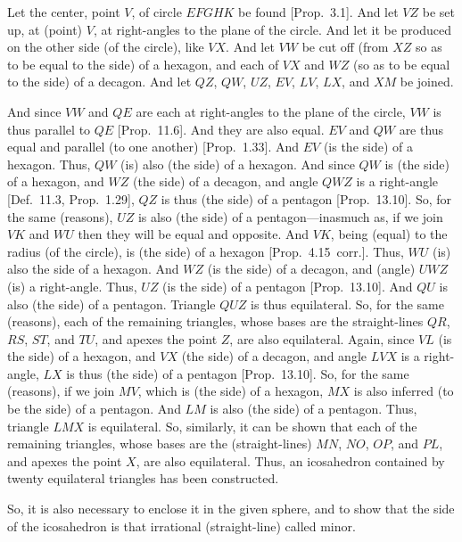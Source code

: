 \begin{Parallel}{}{}
{\epsfysize=3.5in
\centerline{}

Let the center, point $V$, of circle $EFGHK$ be found [Prop.~3.1]. 
And let $VZ$ be set up, at (point) $V$,  at right-angles to the plane of the
circle. And let it be produced on the other side (of the circle), 
like $VX$. And let $VW$ be cut off 
(from $XZ$ so as to be equal to the side) of a hexagon, and each of $VX$ and 
$WZ$ (so as to be equal to the side) of a decagon. And let
$QZ$,  $QW$, $UZ$, $EV$, $LV$, $LX$, and
$XM$ be joined.

And since $VW$ and $QE$ are each at right-angles to the plane of the
circle, $VW$ is thus parallel to $QE$ [Prop.~11.6].  And they are also
equal. $EV$ and $QW$ are thus equal and parallel (to one another) [Prop.~1.33]. And $EV$ (is the side) of a hexagon. Thus, $QW$
(is) also (the side) of a hexagon. And since $QW$ is (the side) of a hexagon, 
and $WZ$ (the side) of a decagon, and angle $QWZ$ is a right-angle
[Def.~11.3, Prop.~1.29], 
$QZ$ is thus (the side) of a pentagon [Prop.~13.10]. So, for the same
(reasons), $UZ$ is also (the side) of a pentagon---inasmuch as, if we join
$VK$ and $WU$ then they will be equal and opposite. 
And $VK$, being (equal)
to the radius (of the circle), is (the side) of a hexagon [Prop.~4.15~corr.].
Thus, $WU$ (is) also the side of a hexagon.
 And $WZ$
(is the side) of a decagon, and (angle) $UWZ$ (is) a right-angle. 
Thus, $UZ$ (is the side) of a pentagon [Prop.~13.10]. And $QU$ is
also (the side) of a pentagon. Triangle $QUZ$ is thus equilateral. So,
for the same (reasons), each of the remaining triangles, whose bases
are the straight-lines $QR$, $RS$, $ST$, and $TU$, and apexes the point
$Z$, are also equilateral. Again, since $VL$ (is the side) of a hexagon, and $VX$ (the side) of a decagon, and angle $LVX$ is a right-angle, 
$LX$ is thus (the side) of a pentagon [Prop.~13.10]. So, for the same
(reasons), if we join $MV$, which is (the side) of a hexagon, $MX$
is also inferred (to be the side) of a pentagon. And $LM$ is also (the side)
of a pentagon. Thus, triangle $LMX$ is equilateral. So, similarly,
it can be shown that each of the remaining triangles, whose bases
are the (straight-lines) $MN$, $NO$, $OP$, and $PL$, and apexes the
point $X$,  are also equilateral. Thus, an icosahedron contained by
twenty equilateral triangles has been constructed.

So, it is also necessary to enclose it in the given sphere, and to show
that the side of the icosahedron is that irrational (straight-line) called minor.

}
\end{Parallel}
